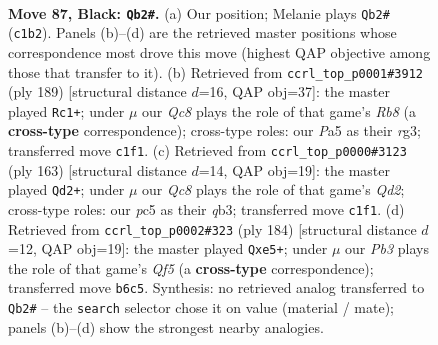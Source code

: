 \documentclass[11pt]{article}
\begin{document}
\clearpage

\begin{figure}[p]\centering
\begin{subfigure}{0.46\textwidth}\centering
\resizebox{\linewidth}{!}{%
\newchessgame
\chessboard[
  setfen={8/8/1p6/p1P5/8/2k5/K7/2q5 b - - 0 87},
  showmover=false,
  pgfstyle=straightmove, color=movearrow, markmove={c1-b2}
]}
\caption{}
\end{subfigure}\hfill
\begin{subfigure}{0.46\textwidth}\centering
\resizebox{\linewidth}{!}{%
\newchessgame
\chessboard[
  setfen={8/8/2k5/4p3/5P2/2K3R1/8/1r6 b - - 1 95},
  showmover=false,
  pgfstyle=straightmove, color=movearrow, markmove={b1-c1}
]}
\caption{}
\end{subfigure}
\\[4pt]
\begin{subfigure}{0.46\textwidth}\centering
\resizebox{\linewidth}{!}{%
\newchessgame
\chessboard[
  setfen={8/3q3k/8/8/5KP1/pQ6/8/8 b - - 7 82},
  showmover=false,
  pgfstyle=straightmove, color=movearrow, markmove={d7-d2}
]}
\caption{}
\end{subfigure}\hfill
\begin{subfigure}{0.46\textwidth}\centering
\resizebox{\linewidth}{!}{%
\newchessgame
\chessboard[
  setfen={8/4k3/1q6/4pQ2/8/8/5P1K/8 w - - 0 93},
  showmover=false,
  pgfstyle=straightmove, color=movearrow, markmove={f5-e5}
]}
\caption{}
\end{subfigure}
\caption{\textbf{Move 87, Black: \texttt{Qb2\#}.} (a) Our position; Melanie plays \texttt{Qb2\#} (\texttt{c1b2}). Panels (b)--(d) are the retrieved master positions whose correspondence most drove this move (highest QAP objective among those that transfer to it). (b) Retrieved from \texttt{ccrl\_top\_p0001\#3912} (ply 189) [structural distance $d$=16, QAP obj=37]: the master played \texttt{Rc1+}; under $\mu$ our \emph{Qc8} plays the role of that game's \emph{Rb8} (a \textbf{cross-type} correspondence); cross-type roles: our \emph{P}a5 as their \emph{r}g3; transferred move \texttt{c1f1}. (c) Retrieved from \texttt{ccrl\_top\_p0000\#3123} (ply 163) [structural distance $d$=14, QAP obj=19]: the master played \texttt{Qd2+}; under $\mu$ our \emph{Qc8} plays the role of that game's \emph{Qd2}; cross-type roles: our \emph{p}c5 as their \emph{q}b3; transferred move \texttt{c1f1}. (d) Retrieved from \texttt{ccrl\_top\_p0002\#323} (ply 184) [structural distance $d$=12, QAP obj=19]: the master played \texttt{Qxe5+}; under $\mu$ our \emph{Pb3} plays the role of that game's \emph{Qf5} (a \textbf{cross-type} correspondence); transferred move \texttt{b6c5}. Synthesis: no retrieved analog transferred to \texttt{Qb2\#} -- the \texttt{search} selector chose it on value (material / mate); panels (b)--(d) show the strongest nearby analogies.}
\label{fig:thought-m173}
\end{figure}
\end{document}
